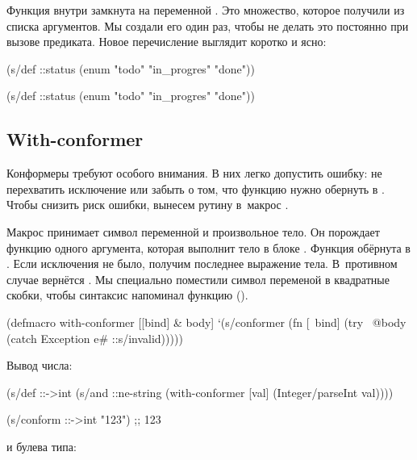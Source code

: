 Функция внутри замкнута на переменной . Это множество, которое
получили из списка аргументов. Мы создали его один раз, чтобы не делать это
постоянно при вызове предиката. Новое перечисление выглядит коротко и ясно:

\ifafive


\begin{clojure}
(s/def ::status
  (enum "todo" "in_progres" "done"))
\end{clojure}


\else


\begin{clojure}
(s/def ::status
  (enum "todo"
        "in_progres"
        "done"))
\end{clojure}


\fi

\subsection{With-conformer}


Конформеры требуют особого внимания. В них легко допустить ошибку: не
перехватить исключение или забыть о том, что функцию нужно обернуть в
. Чтобы снизить риск ошибки, вынесем рутину в~макрос
.

Макрос принимает символ переменной и произвольное тело. Он порождает функцию
одного аргумента, которая выполнит тело в блоке . Функция
обёрнута в . Если исключения не было, получим последнее
выражение тела. В~противном случае вернётся . Мы специально
поместили символ переменой в квадратные скобки, чтобы синтаксис напоминал
функцию ().


\begin{clojure}
(defmacro with-conformer
  [[bind] & body]
  `(s/conformer
    (fn [~bind]
      (try
        ~@body
        (catch Exception e#
          ::s/invalid)))))
\end{clojure}


Вывод числа:


\begin{clojure}
(s/def ::->int
  (s/and
    ::ne-string
    (with-conformer [val]
      (Integer/parseInt val))))

(s/conform ::->int "123")
;; 123
\end{clojure}


\noindent
и булева типа:

